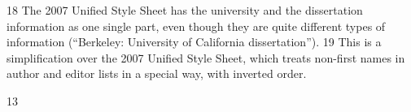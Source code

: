  	
 	
 	
 	
 	
 	
 	
 	
 	
 	
 	
 	
 	
 	
 	
 	
 	
 	
 	
 	
 	
 	
 	
 	
 	
 	
 	
 	
 	
 	
 	
 	
	
 
18
The 2007 Unified Style Sheet has the university and the dissertation information as one single part, even
though they are quite different types of information (“Berkeley: University of California dissertation”).
19
This is a simplification over the 2007 Unified Style Sheet, which treats non-first names in author and
editor lists in a special way, with inverted order.
	
 
 13	
  
